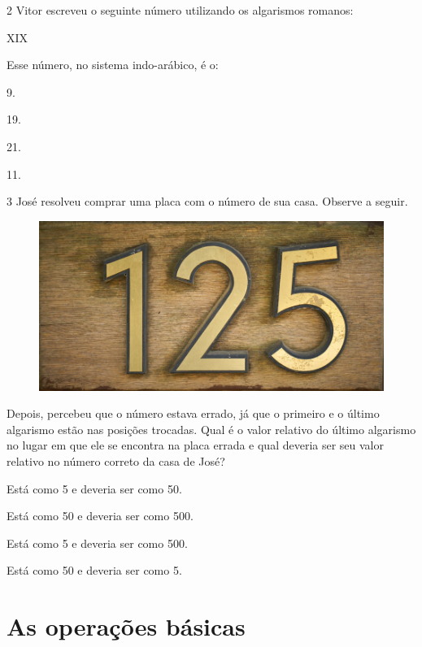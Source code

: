 \num{2} Vitor escreveu o seguinte número utilizando os algarismos romanos:

\begin{myquote}
XIX
\end{myquote}

Esse número, no sistema indo-arábico, é o:

\begin{escolha}
\item
  9.
\item
  19.
\item
  21.
\item
  11.
\end{escolha}

\pagebreak
\num{3} José resolveu comprar uma placa com o número de sua casa. Observe a seguir.

\begin{figure}[htpb!]
\centering
\includegraphics[width=\textwidth]{media/image9.png}
\end{figure}

Depois, percebeu que o número estava
errado, já que o primeiro e o último algarismo estão nas posições
trocadas. Qual é o valor relativo do último algarismo no lugar em que ele se
encontra na placa errada e qual deveria ser seu valor relativo no número
correto da casa de José?

\begin{escolha}
\item
  Está como 5 e deveria ser como 50.
\item
  Está como 50 e deveria ser como 500.
\item
  Está como 5 e deveria ser como 500.
\item
  Está como 50 e deveria ser como 5.
\end{escolha}

\chapter{As operações básicas}

